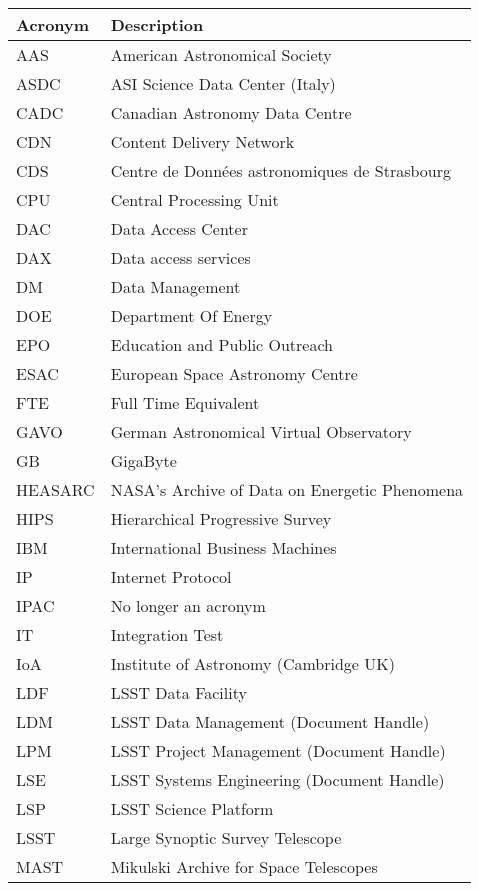 \addtocounter{table}{-1}
\begin{longtable}{|l|p{}|}\hline
\textbf{Acronym} & \textbf{Description}  \\\hline

AAS & American Astronomical Society \\\hline
ASDC & ASI Science Data Center (Italy) \\\hline
CADC & Canadian Astronomy Data Centre \\\hline
CDN & Content Delivery Network \\\hline
CDS & Centre de Données astronomiques de Strasbourg \\\hline
CPU & Central Processing Unit \\\hline
DAC & Data Access Center \\\hline
DAX & Data access services \\\hline
DM & Data Management \\\hline
DOE & Department Of Energy \\\hline
EPO & Education and Public Outreach \\\hline
ESAC & European Space Astronomy Centre \\\hline
FTE & Full Time Equivalent \\\hline
GAVO & German Astronomical Virtual Observatory \\\hline
GB & GigaByte \\\hline
HEASARC & NASA's Archive of Data on Energetic Phenomena \\\hline
HIPS & Hierarchical Progressive Survey \\\hline
IBM & International Business Machines \\\hline
IP & Internet Protocol \\\hline
IPAC & No longer an acronym \\\hline
IT & Integration Test \\\hline
IoA & Institute of Astronomy (Cambridge UK) \\\hline
LDF & LSST Data Facility \\\hline
LDM & LSST Data Management (Document Handle) \\\hline
LPM & LSST Project Management (Document Handle) \\\hline
LSE & LSST Systems Engineering (Document Handle) \\\hline
LSP & LSST Science Platform \\\hline
LSST & Large Synoptic Survey Telescope \\\hline
MAST & Mikulski Archive for Space Telescopes \\\hline

\end{longtable}
